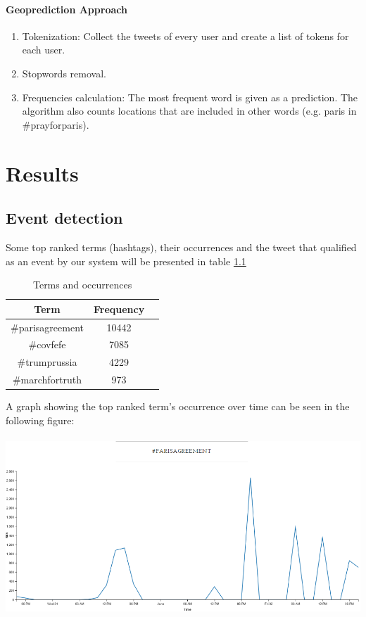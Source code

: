 \documentclass[12pt,svgnames]{report}
\begin{document}
\subsubsection*{Geoprediction Approach}
\begin{enumerate}
	\item Tokenization: Collect the tweets of every user and create a list of tokens for each user.
	\item Stopwords removal.
	\item Frequencies calculation: The most frequent word is given as a prediction. The algorithm also counts locations that are included in other words (e.g. paris in \#prayforparis).
\end{enumerate}

\chapter{Results}
\label{chap:results}
\section*{Event detection}
Some top ranked terms (hashtags), their occurrences and the tweet that qualified as an event by our system will be presented in table \ref{tab:tftags}

\begin{table}[h!]
	\centering

	\begin{tabular}{ccc}
		\toprule
		Term & Frequency\\
		\midrule
		\#parisagreement & 10442\\
		\#covfefe & 7085\\
		\#trumprussia & 4229\\
		\#marchfortruth & 973\\
		\bottomrule
	\end{tabular}
	\caption{Terms and occurrences}
\label{tab:tftags}
\end{table}


A graph showing the top ranked term's occurrence over time can be seen in the following figure:\\
\\
\includegraphics[scale=0.63]{hashparisplot.png}
\\
\end{document}
